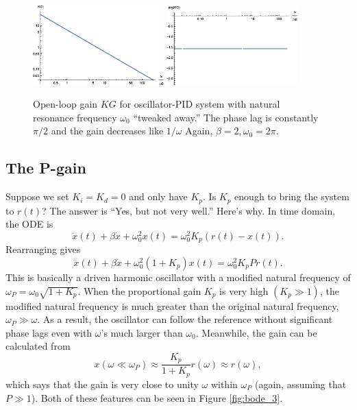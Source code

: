 \documentclass{article}
\theoremstyle{definition}
\newcommand{\f}[2]{\frac{#1}{#2}}
\begin{document}
\begin{figure}
	\centering
	\includegraphics[width=0.45\textwidth]{bode_3}
	\quad
	\includegraphics[width=0.45\textwidth]{bode_4}
	\caption{Open-loop gain $KG$ for oscillator-PID system with natural resonance frequency $\omega_0$ ``tweaked away.'' The phase lag is constantly $\pi/2$ and the gain decreases like $1/\omega$ Again, $\beta = 2,\omega_0 = 2\pi$.} %
	\label{fig:bode_2}
\end{figure}






\subsection{The P-gain}

Suppose we set $K_i = K_d = 0$ and only have $K_p$. Is $K_p$ enough to bring the system to $r(t)$? The answer is ``Yes, but not very well.'' Here's why. In time domain, the ODE is 
\begin{equation*}
\ddot{x}(t) + \beta \dot{x} + \omega_0^2 x(t) = \omega_0^2 K_p (r(t) - x(t)). 
\end{equation*} 
Rearranging gives
\begin{equation*}
\ddot{x}(t) + \beta \dot{x} + \omega_0^2 (1+K_p) x(t) = \omega_0^2 K_p P r(t). 
\end{equation*}
This is basically a driven harmonic oscillator with a modified natural frequency of $\omega_P = \omega_0 \sqrt{1+K_p}$. When the proportional gain $K_p$ is very high $(K_p \gg 1)$, the modified natural frequency is much greater than the original natural frequency, $\omega_P \gg \omega$. As a result, the oscillator can follow the reference without significant phase lags even with $\omega$'s much larger than $\omega_0$. Meanwhile, the gain can be calculated from  
\begin{equation*}
x(\omega\ll \omega_P) \approx \f{K_p}{1+K_p} r(\omega) \approx r(\omega),
\end{equation*}
which says that the gain is very close to unity $\omega$ within $\omega_P$ (again, assuming that $P\gg 1$). Both of these features can be seen in Figure \ref{fig:bode_3}. 
\end{document}
